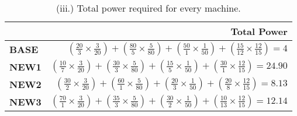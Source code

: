 \documentclass[12pt]{article}
\begin{document}
\begin{table}[h]
\center
\begin{tabular}{|l|r|}
	\hline
	 & \textbf{Total Power} \\
	\hline
	\textbf{BASE} & $(\frac{20}{3} \times \frac{3}{20}) + (\frac{80}{5} \times \frac{5}{80}) + (\frac{50}{1} \times \frac{1}{50}) + (\frac{15}{12} \times \frac{12}{15})  = 4$  \\
	\hline
	\textbf{NEW1} & $(\frac{10}{7} \times \frac{3}{20}) + (\frac{30}{3} \times \frac{5}{80}) + (\frac{15}{5} \times \frac{1}{50}) + 
	(\frac{30}{1} \times \frac{12}{15}) = 24.90$ \\
	\hline
	\textbf{NEW2} & $(\frac{30}{2} \times \frac{3}{20}) + (\frac{60}{1} \times \frac{5}{80}) + (\frac{20}{3} \times \frac{1}{50}) + 
	(\frac{20}{8} \times \frac{12}{15}) = 8.13$ \\
	\hline
	\textbf{NEW3} & $(\frac{70}{1} \times \frac{3}{20}) + (\frac{35}{3} \times \frac{5}{80}) + (\frac{30}{2} \times \frac{1}{50}) + 
	(\frac{10}{13} \times \frac{12}{15}) = 12.14$ \\
	\hline
\end{tabular}
\caption{(iii.) Total power required for every machine.}
\label{tbl:wpwr}
\end{table}
\end{document}
